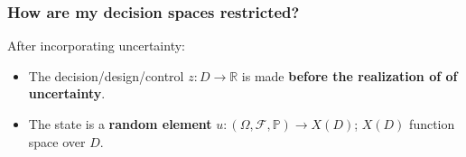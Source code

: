 \documentclass[aspectratio=169,xcolor=dvipsnames,10pt]{beamer}
\begin{document}
\begin{frame}\frametitle{How are my decision spaces restricted?}
\begin{exampleblock}{}
After incorporating uncertainty:
\begin{itemize}
\item The decision/design/control $z : D \to \mathbb R$ is made \textbf{before the realization of of uncertainty}.
\item The state is a \textbf{random element} $u : (\Omega,\mathcal{F},\mathbb P) \to X(D)$; $X(D)$ function space over $D$.
\end{itemize}
\end{exampleblock}

\end{frame}
\end{document}
